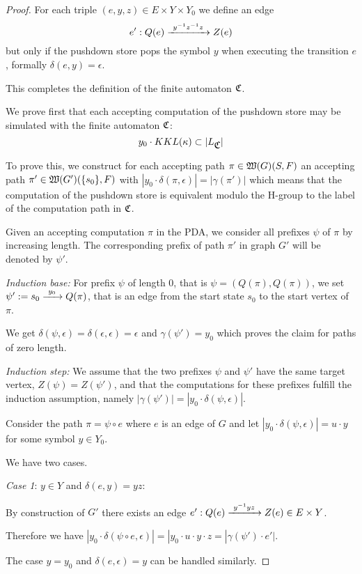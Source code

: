 \begin{proof}
For each triple $(e, y, z) \in E \times Y
\times Y_0$ we define an edge
\[ e': Q(e) \xrightarrow{\ {y^{-1} z^{-1} z}\ } Z(e) \]
but only if the pushdown store pops the symbol $y$ when executing the transition
$e$, formally $\delta(e, y) = \epsilon$.

\bigskip
This completes the definition of the finite automaton $\mbox{$\mathfrak{C}$}$.

We prove first that each accepting computation of the pushdown store may be
simulated with the finite automaton $\mbox{$\mathfrak{C}$}$:
\[ y_0 \cdot KKL(\kappa) \subset |L_{\mbox{$\mathfrak{C}$}}| \]

To prove this, we construct for each accepting path $\pi \in
\mbox{$\mathfrak{W}(G)$}(S,F)$ an accepting path $\pi' \in
\mbox{$\mathfrak{W}(G')$}(\mbox{$\{s_0\}$}, F)$ with $|y_0 \cdot \delta(\pi, \epsilon)| = |\gamma(\pi')|$ 
which means that the computation of the pushdown store is equivalent modulo the
H-group to the label of the computation path in $\mbox{$\mathfrak{C}$}$.

Given an accepting computation $\pi$ in the PDA, we consider all prefixes
$\psi$ of $\pi$ by increasing length. The corresponding prefix of path $\pi'$ in
graph $G'$ will be denoted by $\psi'$.

{\em Induction base:} For prefix $\psi$ of length 0, that is $\psi =
(Q(\pi), Q(\pi))$, we set $\psi' := s_0 \xrightarrow{\ {y_0}\ } Q(\pi)$, that
is an edge from the start state $s_0$ to the start vertex of $\pi$. 

We get $\delta(\psi, \epsilon) = \delta(\epsilon, \epsilon) = \epsilon$ and
$\gamma(\psi') = y_0$ which proves the claim for paths of zero length.

{\em Induction step:} We assume that the two prefixes $\psi$ and $\psi'$ have
the same target vertex, $Z(\psi) = Z(\psi')$, and that the computations for
these prefixes fulfill the induction assumption, namely $|\gamma(\psi')| =
|y_0 \cdot \delta(\psi, \epsilon)|$.

Consider the path $\pi = \psi \circ e$ where $e$ is an edge of $G$ and let
$|y_0 \cdot \delta(\psi, \epsilon)| = u \cdot y$ for some symbol $y \in Y_0$.

We have two cases.

{\em Case 1}: $y \in Y$ and $\delta(e, y) = y z$:

By construction of $G'$ there exists an edge $e': Q(e) \xrightarrow{\ {y^{-1} y z}\ } Z(e)
\in E \times Y$.

Therefore we have $|y_0 \cdot \delta(\psi \circ e, \epsilon)| = |y_0 \cdot u
\cdot y \cdot z = |\gamma(\psi') \cdot e'|$.

The case $y=y_0$ and $\delta(e, \epsilon) = y$ can be handled similarly.


\end{proof}
